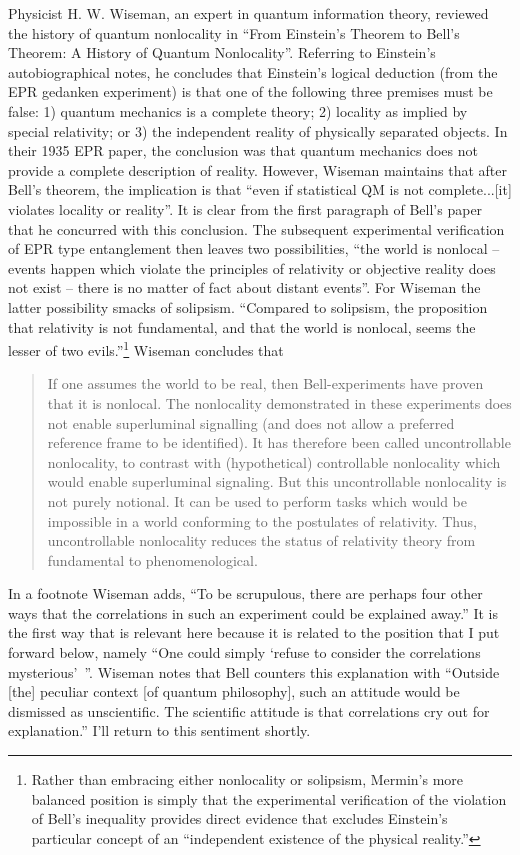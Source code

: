 \documentclass[12pt]{article}
\begin{document}
Physicist H. W. Wiseman, an expert in quantum information theory, reviewed the history of quantum nonlocality in ``From Einstein's Theorem to Bell's Theorem: A History of Quantum Nonlocality''\cite{Wis06}. Referring to Einstein's autobiographical notes\cite{Ein49}, he concludes that Einstein's logical deduction (from the EPR gedanken experiment) is that one of the following three premises must be false: 1) quantum mechanics is a complete theory; 2) locality as implied by special relativity; or 3) the independent reality of physically separated objects. In their 1935 EPR paper, the conclusion was that quantum mechanics does not provide a complete description of reality. However, Wiseman maintains that after Bell's theorem, the implication is that ``even if statistical QM is not complete...[it] violates locality or reality''. It is clear from the first paragraph of Bell's paper\cite{Bel64} that he concurred with this conclusion. The subsequent experimental verification of EPR type entanglement then leaves two possibilities, ``the world is nonlocal -- events happen which violate the principles of relativity or objective reality does not exist -- there is no matter of fact about distant events''\cite{Wis06}. For Wiseman the latter possibility smacks of solipsism. ``Compared to solipsism, the proposition that relativity is not fundamental, and that the world is nonlocal, seems the lesser of two evils.''\footnote{Rather than embracing either nonlocality or solipsism, Mermin's\cite{Mer85} more balanced position is simply that the experimental verification of the violation of Bell's inequality provides direct evidence that excludes Einstein's particular concept of an ``independent existence of the physical reality.''}  Wiseman concludes that
\begin{quote}
If one assumes the world to be real, then Bell-experiments have proven that it is nonlocal. The nonlocality demonstrated in these experiments does not enable superluminal signalling (and does not allow a preferred reference frame to be identified). It has therefore been called uncontrollable nonlocality, to contrast with (hypothetical) controllable nonlocality which would enable superluminal signaling. But this uncontrollable nonlocality is not purely notional. It can be used to perform tasks which would be impossible in a world conforming to the postulates of relativity. Thus, uncontrollable nonlocality reduces the status of relativity theory from fundamental to phenomenological.
\end{quote}
In a footnote Wiseman adds, ``To be scrupulous, there are perhaps four other ways that the correlations in such an experiment could be explained away.'' It is the first way that is relevant here because it is related to the position that I put forward below, namely ``One could simply `refuse to consider the correlations mysterious'~''. Wiseman notes that Bell counters this explanation with\cite{Bel81} ``Outside [the] peculiar context [of quantum philosophy], such an attitude would be dismissed as unscientific. The scientific attitude is that correlations cry out for explanation.'' I'll return to this sentiment shortly.
\end{document}
